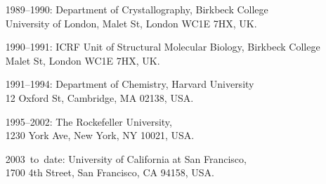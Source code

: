 \begin{htmlonly}
\hspace{1cm} 
\noindent \begin{itemize}
\item[\mbox{1989--1990:}] Department of Crystallography, Birkbeck College \\
                    University of London, Malet St, 
                    London WC1E 7HX, UK. \\

\item[\mbox{1990--1991:}] ICRF Unit of Structural Molecular Biology, 
                    Birkbeck College \\
                    Malet St, London WC1E 7HX, UK. \\

\item[\mbox{1991--1994:}] Department of Chemistry, Harvard University \\
                    12 Oxford St, Cambridge, MA 02138, USA. \\

\item[\mbox{1995--2002:}] The Rockefeller University, \\
                    1230 York Ave, New York, NY 10021, USA. \\

\item[\mbox{2003 to date:}] University of California at San Francisco, \\
                    1700 4th Street, San Francisco, CA 94158, USA. \\
\end{itemize}

\end{htmlonly}
